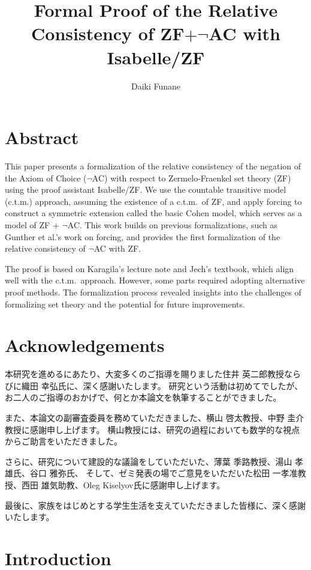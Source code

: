 \documentclass{report}
\title{Formal Proof of the Relative Consistency of ZF$+\neg$AC with Isabelle/ZF}
\author{Daiki Funane}
\affil{Graduate School of Information Sciences, Tohoku University \\
(Draft of Master's Thesis)}
\begin{document}
\maketitle

\chapter*{Abstract}
This paper presents a formalization of the relative consistency of the negation of the Axiom of Choice ($\neg$AC) 
with respect to Zermelo-Fraenkel set theory (ZF) using the proof assistant Isabelle/ZF. 
We use the countable transitive model (c.t.m.) approach, assuming the existence of a c.t.m.\ of ZF, 
and apply forcing to construct a symmetric extension called the basic Cohen model, 
which serves as a model of ZF + $\neg$AC. This work builds on previous formalizations, 
such as Gunther et al.'s work on forcing, and provides the first formalization of the relative consistency of $\neg$AC with ZF.

The proof is based on Karagila's lecture note and Jech's textbook, which align well with the c.t.m.\ approach. 
However, some parts required adopting alternative proof methods.
The formalization process revealed insights into the challenges of formalizing set theory and the potential for future improvements.

\chapter*{Acknowledgements}
本研究を進めるにあたり、大変多くのご指導を賜りました住井 英二郎教授ならびに織田 幸弘氏に、深く感謝いたします。
研究という活動は初めてでしたが、お二人のご指導のおかげで、何とか本論文を執筆することができました。

また、本論文の副審査委員を務めていただきました、横山 啓太教授、中野 圭介教授に感謝申し上げます。
横山教授には、研究の過程においても数学的な視点からご助言をいただきました。

さらに、研究について建設的な議論をしていただいた、薄葉 季路教授、湯山 孝雄氏、谷口 雅弥氏、
そして、ゼミ発表の場でご意見をいただいた松田 一孝准教授、西田 雄気助教、Oleg Kiselyov氏に感謝申し上げます。

最後に、家族をはじめとする学生生活を支えていただきました皆様に、深く感謝いたします。

\clearpage
\tableofcontents
\clearpage




\chapter{Introduction}
\end{document}
